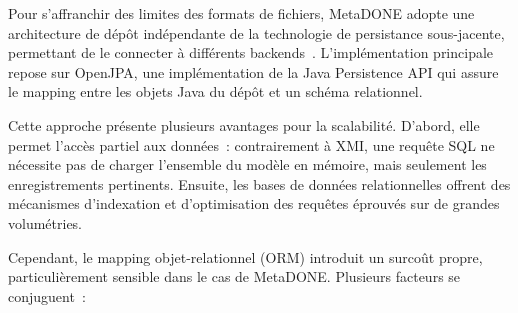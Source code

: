 Pour s'affranchir des limites des formats de fichiers, MetaDONE adopte une architecture de dépôt indépendante de la technologie de persistance sous-jacente, permettant de le connecter à différents backends~\cite{Eng2007}. L'implémentation principale repose sur OpenJPA, une implémentation de la Java Persistence API qui assure le mapping entre les objets Java du dépôt et un schéma relationnel.

Cette approche présente plusieurs avantages pour la scalabilité. D'abord, elle permet l'accès partiel aux données~: contrairement à XMI, une requête SQL ne nécessite pas de charger l'ensemble du modèle en mémoire, mais seulement les enregistrements pertinents. Ensuite, les bases de données relationnelles offrent des mécanismes d'indexation et d'optimisation des requêtes éprouvés sur de grandes volumétries.

Cependant, le mapping objet-relationnel (ORM) introduit un surcoût propre, particulièrement sensible dans le cas de MetaDONE. Plusieurs facteurs se conjuguent~:

